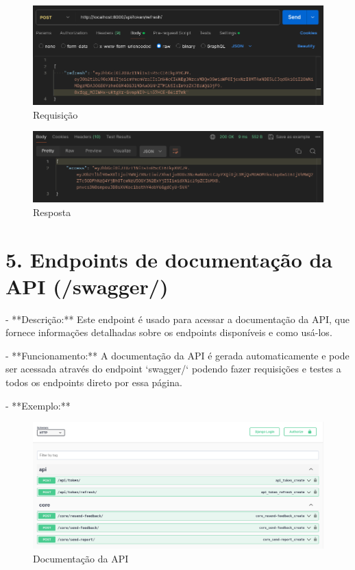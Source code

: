 \begin{figure}[H]
    \centering
    \includegraphics[width=1\textwidth]{figuras/refresh.png}
    \caption{Requisição}
    \label{fig:report_questions}
\end{figure}

\begin{figure}[H]
    \centering
    \includegraphics[width=1\textwidth]{figuras/refresh_result.png}
    \caption{Resposta}
    \label{fig:report_questions}
\end{figure}

\section*{5. Endpoints de documentação da API (/swagger/)}

- **Descrição:** Este endpoint é usado para acessar a documentação da API, que fornece informações detalhadas sobre os endpoints disponíveis e como usá-los.

- **Funcionamento:** A documentação da API é gerada automaticamente e pode ser acessada através do endpoint `swagger/` podendo fazer requisições e testes a todos os endpoints direto por essa página.

- **Exemplo:**

\begin{figure}[H]
    \centering
    \includegraphics[width=1\textwidth]{figuras/swagger.png}
    \caption{Documentação da API}
    \label{fig:report_questions}
\end{figure}

